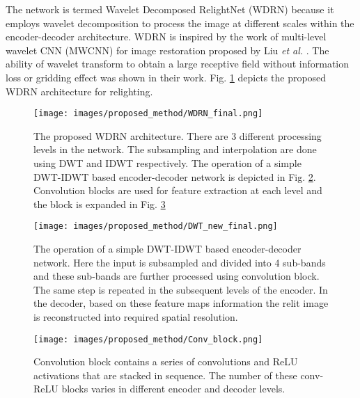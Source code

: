 \documentclass[runningheads]{llncs}
\newcommand{\etal}{\textit{et al. }}
\begin{document}
\par The network is termed Wavelet Decomposed RelightNet (WDRN) because it employs wavelet decomposition to process the image at different scales within the encoder-decoder architecture. WDRN is inspired by the work of multi-level wavelet CNN (MWCNN) for image restoration proposed by  Liu \etal \cite{mwcnn}. The ability of wavelet transform to obtain a large receptive field without information loss or gridding effect was shown in their work. Fig. \ref{fig:wdrn} depicts the proposed WDRN architecture for relighting.
\begin{figure}
    \centering
    \texttt{[image: images/proposed\_method/WDRN\_final.png]}
    \caption{The proposed WDRN architecture. There are 3 different processing levels in the network. The subsampling and interpolation are done using DWT and IDWT respectively. The operation of a simple DWT-IDWT based encoder-decoder network is depicted in Fig. \ref{fig:dwt}. Convolution blocks are used for feature extraction at each level and the block is expanded in Fig. \ref{fig:conv_block}
    }
    \label{fig:wdrn}
    \end{figure}
\begin{figure}
    \centering
    \texttt{[image: images/proposed\_method/DWT\_new\_final.png]}
    \caption{The operation of a simple DWT-IDWT based encoder-decoder network. Here the input is subsampled and divided into 4 sub-bands and these sub-bands are further processed using convolution block. The same step is repeated in the subsequent levels of the encoder. In the decoder, based on these feature maps information the relit image is reconstructed into required spatial resolution.}
    \label{fig:dwt}
\end{figure}
\begin{figure}
    \centering
    \texttt{[image: images/proposed\_method/Conv\_block.png]}
    \caption{Convolution block contains a series of convolutions and ReLU activations that are stacked in sequence. The number of these conv-ReLU blocks varies in different encoder and decoder levels.}
    \label{fig:conv_block}
\end{figure}
\end{document}
